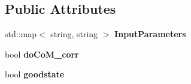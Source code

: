 \subsection*{Public Attributes}
\begin{DoxyCompactItemize}
\item 
\hypertarget{classReadWrite_aa99ba50a35d8391285c1bdde1f1c206d}{std\-::map$<$ string, string $>$ {\bfseries Input\-Parameters}}\label{classReadWrite_aa99ba50a35d8391285c1bdde1f1c206d}

\item 
\hypertarget{classReadWrite_a3221f4b824dc385b066eca732339ee72}{bool {\bfseries do\-Co\-M\-\_\-corr}}\label{classReadWrite_a3221f4b824dc385b066eca732339ee72}

\item 
\hypertarget{classReadWrite_aaf2753e15a5e7f524d6fde9f15ab357b}{bool {\bfseries goodstate}}\label{classReadWrite_aaf2753e15a5e7f524d6fde9f15ab357b}

\end{DoxyCompactItemize}


